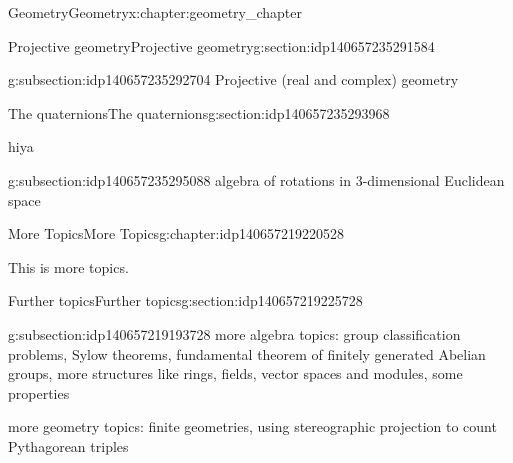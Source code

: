 \documentclass[oneside,10pt,]{book}
\numberwithin{equation}{section}
\begin{document}
\begin{chapterptx}{Geometry}{}{Geometry}{}{}{x:chapter:geometry_chapter}
\begin{sectionptx}{Projective geometry}{}{Projective geometry}{}{}{g:section:idp140657235291584}
\typeout{************************************************}
%
\begin{subsectionptx}{}{}{}{}{}{g:subsection:idp140657235292704}
Projective (real and complex) geometry%
\end{subsectionptx}
\end{sectionptx}
%
%
\typeout{************************************************}
\typeout{************************************************}
%
\begin{sectionptx}{The quaternions}{}{The quaternions}{}{}{g:section:idp140657235293968}
\begin{introduction}{}%
hiya\end{introduction}%
%
%
\typeout{************************************************}
\typeout{************************************************}
%
\begin{subsectionptx}{}{}{}{}{}{g:subsection:idp140657235295088}
algebra of rotations in 3-dimensional Euclidean space%
\end{subsectionptx}
\end{sectionptx}
\end{chapterptx}
%
%
\typeout{************************************************}
\typeout{************************************************}
%
\begin{chapterptx}{More Topics}{}{More Topics}{}{}{g:chapter:idp140657219220528}
\begin{introduction}{}%
This is more topics.\end{introduction}%
%
%
\typeout{************************************************}
\typeout{************************************************}
%
\begin{sectionptx}{Further topics}{}{Further topics}{}{}{g:section:idp140657219225728}
%
%
\typeout{************************************************}
\typeout{************************************************}
%
\begin{subsectionptx}{}{}{}{}{}{g:subsection:idp140657219193728}
more algebra topics: group classification problems, Sylow theorems, fundamental theorem of finitely generated Abelian groups, more structures like rings, fields, vector spaces and modules, some properties%
\par
more geometry topics: finite geometries, using stereographic projection to count Pythagorean triples%
\end{subsectionptx}
\end{sectionptx}
\end{chapterptx}
%
\backmatter
%
%
%
%
\printindex
%
\end{document}
